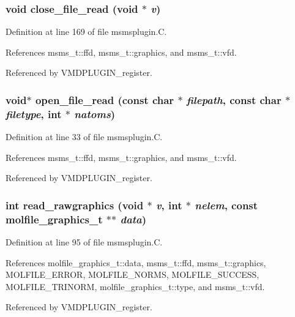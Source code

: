 \subsubsection{\setlength{\rightskip}{0pt plus 5cm}void close\_\-file\_\-read (void $\ast$ {\em v})\hspace{0.3cm}{\tt  [static]}}\label{msmsplugin_8C_a3}




Definition at line 169 of file msmsplugin.C.

References msms\_\-t::ffd, msms\_\-t::graphics, and msms\_\-t::vfd.

Referenced by VMDPLUGIN\_\-register.
\subsubsection{\setlength{\rightskip}{0pt plus 5cm}void$\ast$ open\_\-file\_\-read (const char $\ast$ {\em filepath}, const char $\ast$ {\em filetype}, int $\ast$ {\em natoms})\hspace{0.3cm}{\tt  [static]}}\label{msmsplugin_8C_a1}




Definition at line 33 of file msmsplugin.C.

References msms\_\-t::ffd, msms\_\-t::graphics, and msms\_\-t::vfd.

Referenced by VMDPLUGIN\_\-register.
\subsubsection{\setlength{\rightskip}{0pt plus 5cm}int read\_\-rawgraphics (void $\ast$ {\em v}, int $\ast$ {\em nelem}, const {\bf molfile\_\-graphics\_\-t} $\ast$$\ast$ {\em data})\hspace{0.3cm}{\tt  [static]}}\label{msmsplugin_8C_a2}




Definition at line 95 of file msmsplugin.C.

References molfile\_\-graphics\_\-t::data, msms\_\-t::ffd, msms\_\-t::graphics, MOLFILE\_\-ERROR, MOLFILE\_\-NORMS, MOLFILE\_\-SUCCESS, MOLFILE\_\-TRINORM, molfile\_\-graphics\_\-t::type, and msms\_\-t::vfd.

Referenced by VMDPLUGIN\_\-register.
